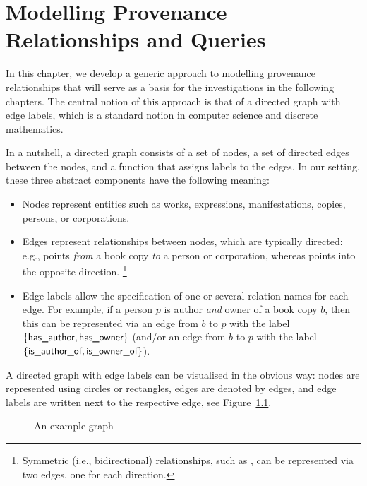 
\chapter{Modelling Provenance Relationships and Queries}

In this chapter, we develop a generic approach to modelling provenance relationships
that will serve as a basis for the investigations in the following chapters.
The central notion of this approach is that of a directed graph with edge labels,
which is a standard notion in computer science and discrete mathematics.

In a nutshell, a directed graph consists of a set of nodes, a set of directed edges between
the nodes, and a function that assigns labels to the edges.
In our setting, these three abstract components have the following meaning:
%
\begin{itemize}
  \item 
    Nodes represent entities such as works, expressions, manifestations, copies,
    persons, or corporations.
  \item 
    Edges represent relationships between nodes, which are typically directed:
    e.g.,  points \emph{from} a book copy \emph{to} a person or corporation,
    whereas  points into the opposite direction.%
    \footnote{%
      Symmetric (i.e., bidirectional) relationships, such as ,
      can be represented via two edges, one for each direction.%
    }
  \item 
    Edge labels allow the specification of one or several relation names for each edge.
    For example, if a person $p$ is author \emph{and} owner of a book copy $b$,
    then this can be represented via an edge from $b$ to $p$ with the label
    $\{\textsf{has\_author},\textsf{has\_owner}\}$
    (and/or an edge from $b$ to $p$ with the label $\{\textsf{is\_author\_of},\textsf{is\_owner\_of}\}$).
\end{itemize}
%
A directed graph with edge labels can be visualised in the obvious way:
nodes are represented using circles or rectangles,
edges are denoted by edges,
and edge labels are written next to the respective edge,
see Figure~\ref{fig:example_eld_graph}.

\begin{figure}
  \caption{An example graph}
  \label{fig:example_eld_graph}
\end{figure}


